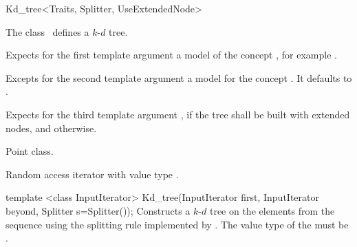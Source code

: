 

\begin{ccRefClass}{Kd_tree<Traits, Splitter, UseExtendedNode>}  %


\ccDefinition  
The class \ccRefName\ defines a $k$-$d$ tree. 


\ccParameters

Expects for the first template argument a model of the concept
, for example .

Excepts for the second template argument a model for the concept .
It defaults  to .

Expects for the third template argument , if the 
tree shall be built with extended nodes, and  otherwise.

\ccTypes

 {Point class.}


\begin{ccAdvanced}
 {Random access iterator 
with value type .}
\end{ccAdvanced}

\ccCreation
{}


\ccConstructor
{template <class InputIterator> Kd_tree(InputIterator first, InputIterator beyond, Splitter s=Splitter());}
{
Constructs a $k$-$d$ tree on the elements from the sequence 
\ccc{[first, beyond)} using the splitting rule implemented by . 
The value type of the  must be .
}


\end{ccRefClass}
